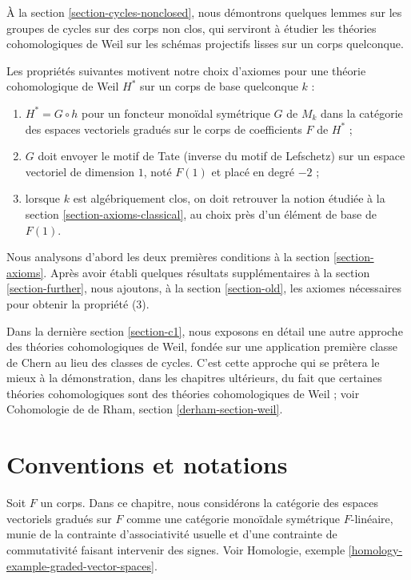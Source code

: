 \medskip\noindent
À la section \ref{section-cycles-nonclosed}, nous démontrons quelques lemmes
sur les groupes de cycles sur des corps non clos, qui serviront à étudier
les théories cohomologiques de Weil sur les schémas projectifs lisses
sur un corps quelconque.

\medskip\noindent
Les propriétés suivantes motivent notre choix d'axiomes pour une théorie
cohomologique de Weil $H^*$ sur un corps de base quelconque $k$ :
\begin{enumerate}
\item $H^* = G \circ h$ pour un foncteur monoïdal symétrique $G$ de $M_k$
dans la catégorie des espaces vectoriels gradués sur le corps de coefficients $F$ de $H^*$ ;
\item $G$ doit envoyer le motif de Tate (inverse du motif de Lefschetz)
sur un espace vectoriel de dimension $1$, noté $F(1)$ et placé en degré $-2$ ;
\item lorsque $k$ est algébriquement clos, on doit retrouver la notion
étudiée à la section \ref{section-axioms-classical},
au choix près d'un élément de base de $F(1)$.
\end{enumerate}
Nous analysons d'abord les deux premières conditions à la section \ref{section-axioms}.
Après avoir établi quelques résultats supplémentaires à la section \ref{section-further},
nous ajoutons, à la section \ref{section-old}, les axiomes nécessaires
pour obtenir la propriété (3).

\medskip\noindent
Dans la dernière section \ref{section-c1}, nous exposons en détail
une autre approche des théories cohomologiques de Weil, fondée sur
une application première classe de Chern au lieu des classes de cycles.
C'est cette approche qui se prêtera le mieux à la démonstration, dans
les chapitres ultérieurs, du fait que certaines théories cohomologiques
sont des théories cohomologiques de Weil ; voir
Cohomologie de de Rham, section \ref{derham-section-weil}.





\section{Conventions et notations}
\label{section-conventions}

\noindent
Soit $F$ un corps. Dans ce chapitre, nous considérons la catégorie des espaces
vectoriels gradués sur $F$ comme une catégorie monoïdale symétrique $F$-linéaire,
munie de la contrainte d'associativité usuelle et d'une contrainte de commutativité
faisant intervenir des signes.
Voir Homologie, exemple \ref{homology-example-graded-vector-spaces}.

